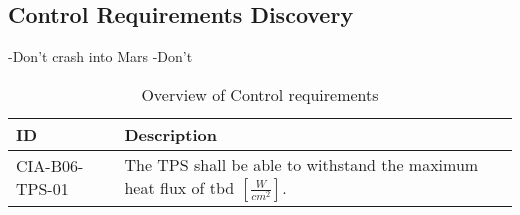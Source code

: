 \subsection{Control Requirements Discovery} \label{sec:req-control}

-Don't crash into Mars
-Don't 

\begin{table}[H]
	\caption{Overview of Control requirements}
	\begin{tabular}{|p{}|p{}|}
		\hline
		ID          & Description                                                                                                      \\ \hline \hline
		CIA-B06-TPS-01 & The TPS shall be able to withstand the maximum heat flux of \gls{tbd} $\left[\frac{W}{cm^2}\right]$.               
		
	\end{tabular}
	\label{tab:thermalreq}
\end{table}